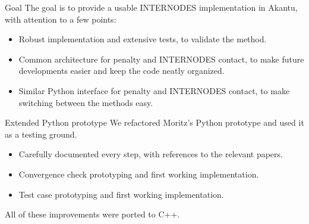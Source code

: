 \documentclass[aspectratio=169, xcolor={svgnames}]{beamer}
\begin{document}
\begin{frame}{Goal}
The goal is to provide a usable INTERNODES implementation in Akantu, with attention to a few points:
\begin{itemize}
    \item Robust implementation and extensive tests, to validate the method.
    \item Common architecture for penalty and INTERNODES contact, to make future developments easier and keep the code neatly organized.
    \item Similar Python interface for penalty and INTERNODES contact, to make switching between the methods easy.
\end{itemize}
\end{frame}

\begin{frame}{Extended Python prototype}
\pause
We refactored Moritz's Python prototype and used it as a testing ground.
\begin{itemize}
    \item Carefully documented every step, with references to the relevant papers.
    \item Convergence check prototyping and first working implementation.
    \item Test case prototyping and first working implementation.
\end{itemize}
All of these improvements were ported to C++.
\end{frame}
\end{document}
